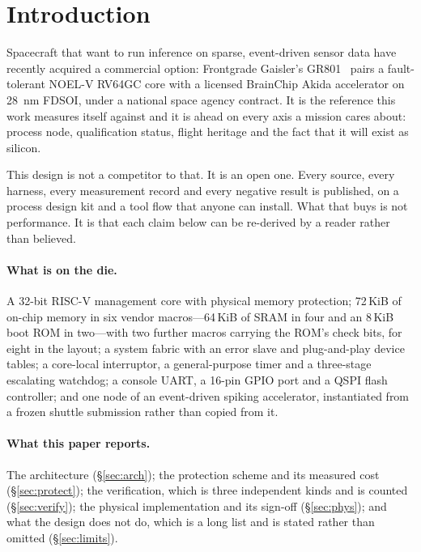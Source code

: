 \documentclass[11pt,a4paper]{article}
\begin{document}
\section{Introduction}
\label{sec:intro}

Spacecraft that want to run inference on sparse, event-driven sensor data
have recently acquired a commercial option: Frontgrade Gaisler's
GR801~\cite{gr801}
pairs a fault-tolerant NOEL-V RV64GC core with a licensed BrainChip
Akida accelerator on \SI{28}{\nano\meter} FDSOI, under a national space
agency contract. It is the reference this work measures itself against
and it is ahead on every axis a mission cares about: process node,
qualification status, flight heritage and the fact that it will exist as
silicon.

This design is not a competitor to that. It is an open one. Every
source, every harness, every measurement record and every negative
result is published, on a process design kit and a tool flow that anyone
can install. What that buys is not performance. It is that each claim
below can be re-derived by a reader rather than believed.

\paragraph{What is on the die.} A \num{32}-bit RISC-V management core
with physical memory protection; \num{72}\,KiB of on-chip memory in six
vendor macros---\num{64}\,KiB of SRAM in four and an \num{8}\,KiB boot
ROM in two---with two further macros carrying the ROM's check bits, for
eight in the layout; a system fabric with an error slave and
plug-and-play device tables; a core-local interruptor, a general-purpose
timer and a three-stage escalating watchdog; a console UART, a
\num{16}-pin GPIO port and a QSPI flash controller; and one node of an
event-driven spiking accelerator, instantiated from a frozen shuttle
submission rather than copied from it.

\paragraph{What this paper reports.} The architecture
(\S\ref{sec:arch}); the protection scheme and its measured cost
(\S\ref{sec:protect}); the verification, which is three independent
kinds and is counted (\S\ref{sec:verify}); the physical implementation
and its sign-off (\S\ref{sec:phys}); and what the design does not do,
which is a long list and is stated rather than omitted
(\S\ref{sec:limits}).
\end{document}

